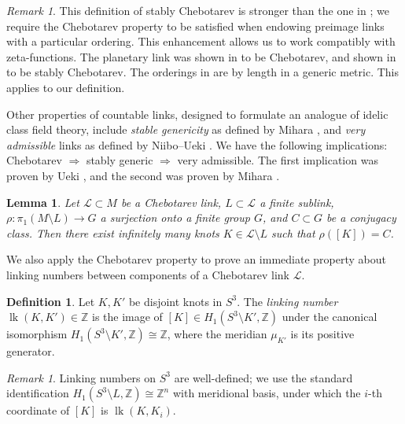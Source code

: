 \documentclass{amsart}
\theoremstyle{plain}
\theoremstyle{definition}
\newtheorem{Def}[theorem]{Definition}
\theoremstyle{plain}
\theoremstyle{plain}
\theoremstyle{plain}
\newtheorem{lemma}[theorem]{Lemma}
\theoremstyle{remark}
\newtheorem{remark}[theorem]{Remark}
\theoremstyle{remark}
\theoremstyle{plain}
\theoremstyle{definition}
\theoremstyle{plain}
\DeclareMathOperator{\lk}{\mathrm{lk}}
\theoremstyle{plain}
\theoremstyle{plain}
\numberwithin{equation}{section}
\begin{document}
\begin{remark}\label{rmk:stably}
This definition of stably Chebotarev is stronger than the one in \cite{ueki2021chebotarev}; we require the Chebotarev property to be satisfied when endowing preimage links with a particular ordering. This enhancement allows us to work compatibly with zeta-functions. The planetary link was shown in \cite{mcmullen2013knots} to be Chebotarev, and shown in \cite{ueki2021chebotarev} to be stably Chebotarev. The orderings in \cite{ueki2021chebotarev} are by length in a generic metric. This applies to our definition. 
\end{remark}

Other properties of countable links, designed to formulate an analogue of idelic class field theory, include \emph{stable genericity} as defined by Mihara \cite{mihara}, and \emph{very admissible} links as defined by Niibo--Ueki \cite{uekiniibo}. We have the following implications: Chebotarev $\Longrightarrow$ stably generic $\Longrightarrow$ very admissible. The first implication was proven by Ueki \cite{ueki2021chebotarev}, and the second was proven by Mihara \cite{mihara}. 

\begin{lemma}\label{lma:chebo}
Let $\mathcal{L} \subset M$ be a Chebotarev link, $L \subset \mathcal{L}$ a finite sublink, $\rho: \pi_1(M \setminus L) \to G$ a surjection onto a finite group $G$, and $C \subset G$ be a conjugacy class. Then there exist infinitely many knots $K \in \mathcal{L} \setminus L$ such that $\rho([K]) = C$.
\end{lemma}

We also apply the Chebotarev property to prove an immediate property about linking numbers between components of a Chebotarev link $\mathcal{L}$. 

\begin{Def}
Let $K, K'$ be disjoint knots in $S^3$. The \emph{linking number} $\lk(K, K') \in \mathbb{Z}$ is the image of $[K] \in H_1(S^3 \setminus K', \mathbb{Z})$ under the canonical isomorphism $H_1(S^3 \setminus K', \mathbb{Z}) \cong \mathbb{Z}$, where the meridian $\mu_{K'}$ is its positive generator. 
\end{Def}

\begin{remark}
Linking numbers on $S^3$ are well-defined; we use the standard identification $H_1(S^3 \setminus L, \mathbb{Z}) \cong \mathbb{Z}^n$ with meridional basis, under which the $i$-th coordinate of $[K]$ is $\lk(K, K_i)$.
\end{remark}
\end{document}

